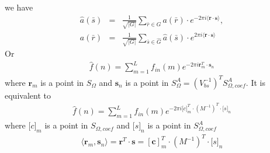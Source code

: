 \documentclass[10pt]{book}
\def\bm{\boldsymbol}
\newcommand{\bea}{\begin{eqnarray}}
\newcommand{\eea}{\end{eqnarray}}
\newcommand{\no}{\nonumber \\}
\def\la{\langle}
\def\ra{\rangle}
\begin{document}
we have
\bea 
\hat{a}(\bar{s})&=&
 \frac{1}{\sqrt{|G|}}\sum_{\bar{r}\in G} a(\bar{r})\cdot e^{-2\pi i \la {\bm r}\cdot{\bm s}\ra},\no 
{a}(\bar{r})&=&
\frac{1}{\sqrt{|G|}}\sum_{\bar{s}\in \hat{G}} \hat{a}(\bar{s})\cdot e^{2\pi i \la {\bm r}\cdot{\bm s}\ra} 	
\eea 
Or  
\bea 
\hat{f}(n)=\sum_{m=1}^{L} f_{in}(m) e^{-2\pi i {\bm r}^T_{m}\cdot {\bm s}_{n}}
\eea   
where     ${\bm r}_{m}$ is a point in $S_{\Omega}$ and ${\bm s}_{n}$
is a point in $S^A_{\Omega}=(V_{bs}^{-1})^T S^A_{\Omega,coef}$.
It is equivalent to
\bea 
\hat{f}(n)=\sum_{m=1}^{L} f_{in}(m) e^{-2\pi i {\bm [c]}^T_{m}\cdot(M^{-1})^T\cdot {\bm [s]}_{n}}
\eea   
where ${\bm [c]}_m$ is a point in $S_{\Omega,coef}$
and ${\bm [s]}_n$ is a point in $S^A_{\Omega,coef}$
	\bea 
\la {\bm r}_m,{\bm s}_n\ra ={\bm r}^T\cdot{\bm s}={[\bm c]}_m^T\cdot (M^{-1})^T\cdot {\bm [s]}_{n}
\eea 
\end{document}
